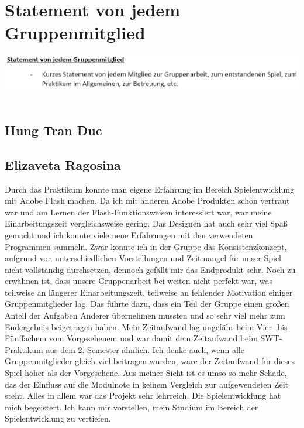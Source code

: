 \documentclass[a4paper, 11pt]{article} %
\begin{document}
\section{Statement von jedem Gruppenmitglied}
\includegraphics[scale=0.5]{images/statement.png}\\\\
\subsection{Hung Tran Duc}
\subsection{Elizaveta Ragosina}
Durch das Praktikum konnte man eigene Erfahrung im Bereich Spielentwicklung mit Adobe Flash machen. Da ich mit anderen Adobe Produkten schon vertraut war und am Lernen der Flash-Funktionsweisen interessiert war, war meine Einarbeitungszeit vergleichsweise gering. Das Designen hat auch sehr viel Spaß gemacht und ich konnte viele neue Erfahrungen mit den verwendeten Programmen sammeln. Zwar konnte ich in der Gruppe das Konsistenzkonzept, aufgrund von unterschiedlichen Vorstellungen und Zeitmangel für unser Spiel nicht vollständig durchsetzen, dennoch gefällt mir das Endprodukt sehr.
Noch zu erwähnen ist, dass unsere Gruppenarbeit bei weiten nicht perfekt war, was teilweise an längerer Einarbeitungszeit, teilweise an fehlender Motivation einiger Gruppenmitglieder lag. Das führte dazu, dass ein Teil der Gruppe einen großen Anteil der Aufgaben Anderer übernehmen mussten und so sehr viel mehr zum Endergebnis beigetragen haben. Mein Zeitaufwand lag ungefähr beim Vier- bis Fünffachem vom Vorgesehenem und war damit dem Zeitaufwand beim SWT-Praktikum aus dem 2. Semester ähnlich. Ich denke auch, wenn alle Gruppenmitglieder gleich viel beitragen würden, wäre der Zeitaufwand für dieses Spiel höher als der Vorgesehene. Aus meiner Sicht ist es umso so mehr Schade, das der Einfluss auf die Modulnote in keinem Vergleich zur aufgewendeten Zeit steht.
Alles in allem war das Projekt sehr lehrreich. Die Spielentwicklung hat mich begeistert. Ich kann mir vorstellen, mein Studium im Bereich der Spielentwicklung zu vertiefen.
\end{document}
